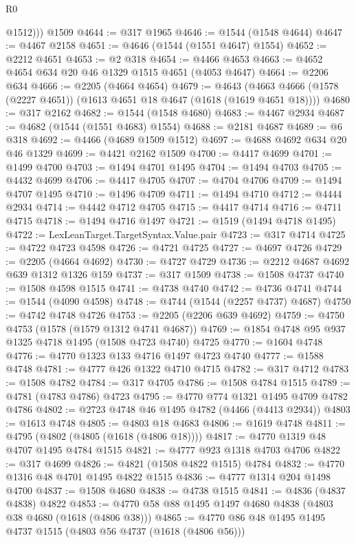 \begin{lexlean}{R0}
\begin{coremodule}
          @1512)))
    @1509
@4644 := @317 @1965
@4646 := @1544 (@1548 @4644)
@4647 := @4467 @2158
@4651 := @4646 (@1544 (@1551 @4647) @1554)
@4652 := @2212 @4651
@4653 := @2 @318
@4654 := @4466 @4653
@4663 := @4652 @4654 @634 @20 @46 @1329 @1515 @4651 (@4053 @4647)
@4664 := @2206 @634
@4666 := @2205 (@4664 @4654)
@4679 := @4643 (@4663 @4666 (@1578 (@2227 @4651)) (@1613 @4651 @18 @4647 (@1618 (@1619 @4651 @18))))
@4680 := @317 @2162
@4682 := @1544 (@1548 @4680)
@4683 := @4467 @2934
@4687 := @4682 (@1544 (@1551 @4683) @1554)
@4688 := @2181 @4687
@4689 := @6 @318
@4692 := @4466 (@4689 @1509 @1512)
@4697 := @4688 @4692 @634 @20 @46 @1329
@4699 := @4421 @2162 @1509
@4700 := @4417 @4699
@4701 := @1499 @4700
@4703 := @1494 @4701 @1495
@4704 := @1494 @4703
@4705 := @4432 @4699
@4706 := @4417 @4705
@4707 := @4704 @4706
@4709 := @1494 @4707 @1495
@4710 := @1496 @4709
@4711 := @1494 @4710
@4712 := @4444 @2934
@4714 := @4442 @4712 @4705
@4715 := @4417 @4714
@4716 := @4711 @4715
@4718 := @1494 @4716 @1497
@4721 := @1519 (@1494 @4718 @1495)
@4722 := LexLeanTarget.TargetSyntax.Value.pair
@4723 := @317 @4714
@4725 := @4722 @4723 @4598
@4726 := @4721 @4725
@4727 := @4697 @4726
@4729 := @2205 (@4664 @4692)
@4730 := @4727 @4729
@4736 := @2212 @4687 @4692 @639 @1312 @1326 @159
@4737 := @317 @1509
@4738 := @1508 @4737
@4740 := @1508 @4598 @1515
@4741 := @4738 @4740
@4742 := @4736 @4741
@4744 := @1544 (@4090 @4598)
@4748 := @4744 (@1544 (@2257 @4737) @4687)
@4750 := @4742 @4748 @4726
@4753 := @2205 (@2206 @639 @4692)
@4759 := @4750 @4753 (@1578 (@1579 @1312 @4741 @4687))
@4769 := @1854 @4748 @95 @937 @1325 @4718 @1495 (@1508 @4723 @4740) @4725
@4770 := @1604 @4748
@4776 := @4770 @1323 @133 @4716 @1497 @4723 @4740
@4777 := @1588 @4748
@4781 := @4777 @426 @1322 @4710 @4715
@4782 := @317 @4712
@4783 := @1508 @4782
@4784 := @317 @4705
@4786 := @1508 @4784 @1515
@4789 := @4781 (@4783 @4786) @4723
@4795 := @4770 @774 @1321 @1495 @4709 @4782 @4786
@4802 := @2723 @4748 @46 @1495 @4782 (@4466 (@4413 @2934))
@4803 := @1613 @4748
@4805 := @4803 @18 @4683
@4806 := @1619 @4748
@4811 := @4795 (@4802 (@4805 (@1618 (@4806 @18))))
@4817 := @4770 @1319 @48 @4707 @1495 @4784 @1515
@4821 := @4777 @923 @1318 @4703 @4706
@4822 := @317 @4699
@4826 := @4821 (@1508 @4822 @1515) @4784
@4832 := @4770 @1316 @48 @4701 @1495 @4822 @1515
@4836 := @4777 @1314 @204 @1498 @4700
@4837 := @1508 @4680
@4838 := @4738 @1515
@4841 := @4836 (@4837 @4838) @4822
@4853 := @4770 @58 @88 @1495 @1497 @4680 @4838 (@4803 @38 @4680 (@1618 (@4806 @38)))
@4865 := @4770 @86 @48 @1495 @1495 @4737 @1515 (@4803 @56 @4737 (@1618 (@4806 @56)))

\end{coremodule}
\end{lexlean}
